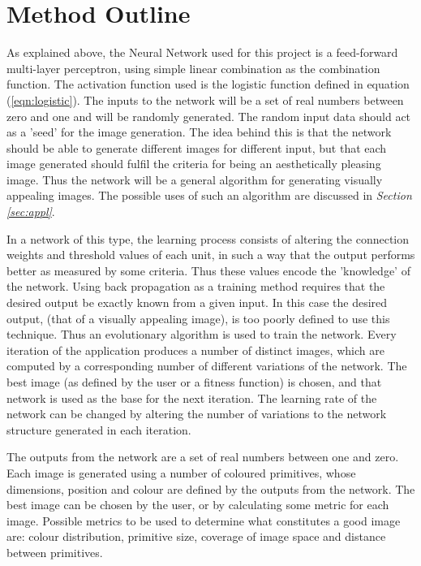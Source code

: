\documentclass{acm_proc_article-sp}
\begin{document}
\section{Method Outline}
\label{sec:method}

As explained above, the Neural Network used for this project is a feed-forward multi-layer perceptron, using simple linear combination as the combination function. The activation function used is the logistic function defined in equation (\ref{eqn:logistic}). The inputs to the network will be a set of real numbers between zero and one and will be randomly generated. The random input data should act as a 'seed' for the image generation. The idea behind this is that the network should be able to generate different images for different input, but that each image generated should fulfil the criteria for being an aesthetically pleasing image. Thus the network will be a general algorithm for generating visually appealing images. The possible uses of such an algorithm are discussed in \textit{Section \ref{sec:appl}}. 

\vspace{3mm} 

In a network of this type, the learning process consists of altering the connection weights and threshold values of each unit, in such a way that the output performs better as measured by some criteria. Thus these values encode the 'knowledge' of the network. Using back propagation as a training method requires that the desired output be exactly known from a given input. In this case the desired output, (that of a visually appealing image), is too poorly defined to use this technique. Thus an evolutionary algorithm is used to train the network. Every iteration of the application produces a number of distinct images, which are computed by a corresponding number of different variations of the network. The best image (as defined by the user or a fitness function) is chosen, and that network is used as the base for the next iteration. The learning rate of the network can be changed by altering the number of variations to the network structure generated in each iteration.

\vspace{3mm}

The outputs from the network are a set of real numbers between one and zero. Each image is generated using a number of coloured primitives, whose dimensions, position and colour are defined by the outputs from the network. The best image can be chosen by the user, or by calculating some metric for each image. Possible metrics to be used to determine what constitutes a good image are: colour distribution, primitive size, coverage of image space and distance between primitives. 
\end{document}
